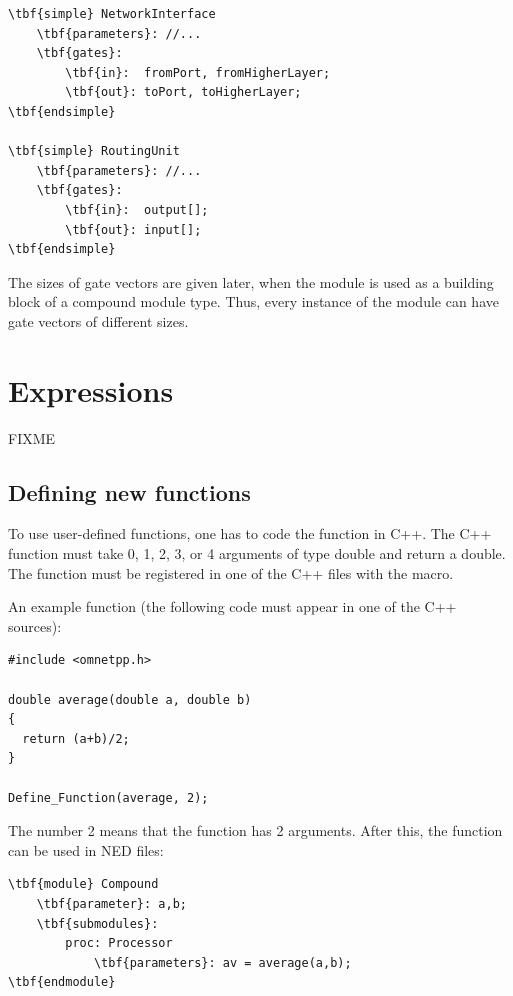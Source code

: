\begin{Verbatim}[commandchars=\\\{\}]
\tbf{simple} NetworkInterface
    \tbf{parameters}: //...
    \tbf{gates}:
        \tbf{in}:  fromPort, fromHigherLayer;
        \tbf{out}: toPort, toHigherLayer;
\tbf{endsimple}

\tbf{simple} RoutingUnit
    \tbf{parameters}: //...
    \tbf{gates}:
        \tbf{in}:  output[];
        \tbf{out}: input[];
\tbf{endsimple}
\end{Verbatim}

The sizes of gate vectors are given later, when the module is used as
a building block of a compound module type. Thus, every instance of
the module can have gate vectors of different sizes.

\section{Expressions}

FIXME

\subsection{Defining new functions}
\label{sec:ch-ned-lang:defining-functions}

To use user-defined functions, one has
to code the function in C++.  The C++ function must take 0, 1, 2, 3, or 4
arguments of type double and return a double. The function must be
registered in one of the C++ files with the 
macro.

An example function (the following code must appear in one of the C++
sources):


\begin{verbatim}
#include <omnetpp.h>

double average(double a, double b)
{
  return (a+b)/2;
}

Define_Function(average, 2);
\end{verbatim}


The number 2 means that the  function has 2
arguments.  After this, the  function can be used in
NED files:


\begin{Verbatim}[commandchars=\\\{\}]
\tbf{module} Compound
    \tbf{parameter}: a,b;
    \tbf{submodules}:
        proc: Processor
            \tbf{parameters}: av = average(a,b);
\tbf{endmodule}
\end{Verbatim}


